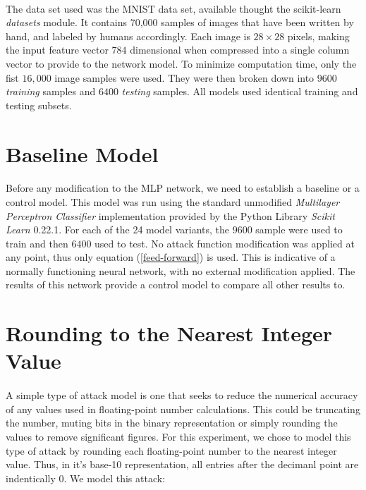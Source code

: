 \documentclass[12pt,letterpaper]{article}
\begin{document}
\paragraph*{}The data set used was the MNIST data set, available thought the scikit-learn \textit{datasets} module. It contains 70,000 samples of images that have been written by hand, and labeled by humans accordingly. Each image is $28 \times 28$ pixels, making the input feature vector $784$ dimensional when compressed into a single column vector to provide to the network model. To minimize computation time, only the fist $16,000$ image samples were used. They were then broken down into $9600$ \textit{training} samples and $6400$ \textit{testing} samples. All models used identical training and testing subsets.


\section*{Baseline Model}

\paragraph*{}Before any modification to the MLP network, we need to establish a baseline or a control model. This model was run using the standard unmodified \textit{Multilayer Perceptron Classifier} implementation provided by the Python Library \textit{Scikit Learn} 0.22.1. For each of the 24 model variants, the $9600$ sample were used to train and then $6400$ used to test. No attack function modification was applied at any point, thus only equation (\ref{feed-forward}) is used. This is indicative of a normally functioning neural network, with no external modification applied. The results of this network provide a control model to compare all other results to.


\section*{Rounding to the Nearest Integer Value}

\paragraph*{}A simple type of attack model is one that seeks to reduce the numerical accuracy of any values used in floating-point number calculations.  This could be truncating the number, muting bits in the binary representation or simply rounding the values to remove significant figures. For this experiment, we chose to model this type of attack by rounding each floating-point number to the nearest integer value. Thus, in it's base-10 representation, all entries after the decimanl point are indentically $0$. We model this attack:
\end{document}
